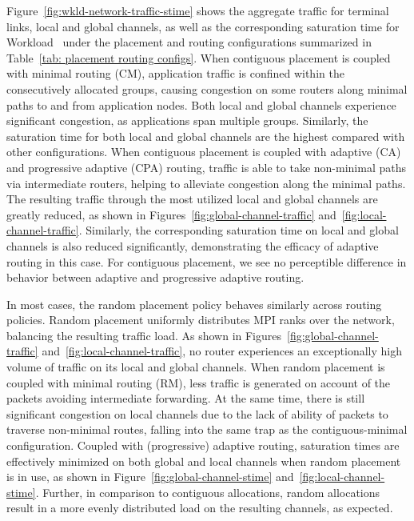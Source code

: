 Figure~\ref{fig:wkld-network-traffic-stime} shows the aggregate traffic for terminal links, local and global channels,
as well as the corresponding saturation time for Workload~ under the placement and routing configurations summarized in Table~\ref{tab: placement routing configs}.
When contiguous placement is coupled with minimal routing (CM), 
application traffic is confined within the consecutively allocated groups, 
causing congestion on some routers along minimal paths to and from application nodes. 
Both local and global channels experience significant congestion, as applications span multiple groups.
Similarly, the saturation time for both local and global channels are the highest compared with other configurations.
When contiguous placement is coupled with adaptive (CA) and progressive adaptive (CPA) routing, 
traffic is able to take non-minimal paths via intermediate routers, helping to alleviate congestion along the minimal paths. 
The resulting traffic through the most utilized local and global channels are greatly reduced, 
as shown in Figures~\ref{fig:global-channel-traffic} and~\ref{fig:local-channel-traffic}. 
Similarly, the corresponding saturation time on local and global channels is also reduced significantly, 
demonstrating the efficacy of adaptive routing in this case. 
For contiguous placement, we see no perceptible difference in behavior between adaptive and progressive adaptive routing.


In most cases, the random placement policy behaves similarly across routing policies.
Random placement uniformly distributes MPI ranks over the network, 
balancing the resulting traffic load. 
As shown in Figures~\ref{fig:global-channel-traffic} and~\ref{fig:local-channel-traffic}, 
no router experiences an exceptionally high volume of traffic on its local and global channels. 
When random placement is coupled with minimal routing (RM), less traffic is generated on account of
the packets avoiding intermediate forwarding. At the same time, there is still significant congestion on local channels due to the lack of ability of packets to traverse non-minimal routes, falling into the same trap as the contiguous-minimal configuration.
Coupled with (progressive) adaptive routing,
saturation times are effectively minimized on both global and local channels when random placement is in use, 
as shown in Figure~\ref{fig:global-channel-stime} and~\ref{fig:local-channel-stime}. Further, in comparison to contiguous allocations, random allocations result in a more evenly distributed load on the resulting channels, as expected.

